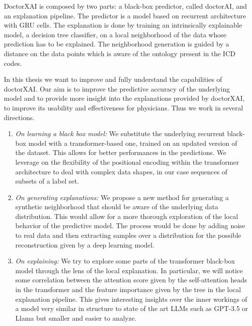 \documentclass[]{marticle}
\begin{document}
DoctorXAI is composed by two parts: a black-box predictor, called doctorAI, and an explanation
pipeline. The predictor is a model based on recurrent architecture with GRU cells. The explanation
is done by training an intrinsically explainable model, a decision tree classifier, on a local
neighborhood of the data whose prediction has to be explained. The neighborhood generation is guided
by a distance on the data points which is aware of the ontology present in the ICD codes.

In this thesis we want to improve and fully understand the capabilities of doctorXAI. Our aim is to
improve the predictive accuracy of the underlying model and to provide more insight into the
explanations provided by doctorXAI, to improve its usability and effectiveness for physicians. Thus
we work in several directions.
\begin{enumerate}
\item \emph{On learning a black box model:} We substitute the underlying recurrent black-box model
with a transformer-based one, trained on an updated version of the dataset. This allows for better
performances in the predictions. We leverage on the flexibility of the positional encoding within
the transformer architecture to deal with complex data shapes, in our case sequences of subsets of a
label set.

\item \emph{On generating explanations:}  We propose a new method for generating a synthetic
neighborhood that should be aware of the underlying data distribution. This would allow for a more
thorough exploration of the local behavior of the predictive model. The process would be done by
adding noise to real data and then extracting samples over a distribution for the possible
reconstruction given by a deep learning model.

\item \emph{On explaining:} We try to explore some parts of the transformer black-box model
through the lens of the local explanation. In particular, we will notice some correlation between the
attention score given by the self-attention heads in the transformer and the feature importance
given by the tree in the local explanation pipeline. This gives interesting insights over the inner
workings of a model very similar in structure to state of the art LLMs such as GPT-3.5 or Llama but
smaller and easier to analyze.
\end{enumerate}
\end{document}
